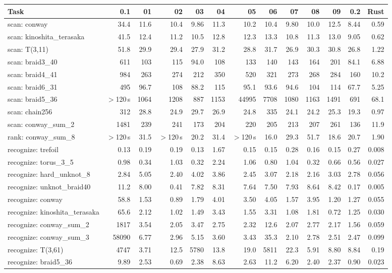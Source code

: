 \begin{tabular}{@{}lrrrrrrrrrrrr@{}}
\toprule
Task & 0.1 & 01 & 02 & 03 & 04 & 05 & 06 & 07 & 08 & 09 & 0.2 & Rust \\
\midrule
scan: conway & 34.4 & 11.6 & 10.4 & 9.86 & 11.3 & 10.2 & 10.4 & 9.80 & 10.0 & 12.5 & 8.44 & 0.59 \\
scan: kinoshita\_terasaka & 41.5 & 12.4 & 11.2 & 10.5 & 12.8 & 12.3 & 13.3 & 10.8 & 11.3 & 13.0 & 9.05 & 0.62 \\
scan: T(3,11) & 51.8 & 29.9 & 29.4 & 27.9 & 31.2 & 28.8 & 31.7 & 26.9 & 30.3 & 30.8 & 26.8 & 1.22 \\
scan: braid3\_40 & 611 & 103 & 115 & 94.0 & 108 & 133 & 140 & 143 & 164 & 201 & 84.1 & 6.88 \\
scan: braid4\_41 & 984 & 263 & 274 & 212 & 350 & 520 & 321 & 273 & 268 & 284 & 160 & 10.2 \\
scan: braid6\_31 & 495 & 96.7 & 108 & 88.2 & 115 & 95.1 & 93.6 & 94.6 & 104 & 114 & 67.7 & 5.25 \\
scan: braid5\_36 & $>$120\,s & 1064 & 1208 & 887 & 1153 & 44995 & 7708 & 1080 & 1163 & 1491 & 691 & 68.1 \\
scan: chain256 & 312 & 28.8 & 24.9 & 29.7 & 26.9 & 24.8 & 335 & 24.1 & 24.2 & 25.3 & 19.3 & 0.97 \\
scan: conway\_sum\_2 & 1481 & 239 & 241 & 173 & 204 & 220 & 205 & 213 & 207 & 261 & 136 & 11.9 \\
\midrule
rank: conway\_sum\_8 & $>$120\,s & 31.5 & $>$120\,s & 20.2 & 31.4 & $>$120\,s & 16.0 & 29.3 & 51.7 & 18.6 & 20.7 & 1.90 \\
\midrule
recognize: trefoil & 0.13 & 0.19 & 0.19 & 0.13 & 1.67 & 0.15 & 0.15 & 0.28 & 0.16 & 0.15 & 0.27 & 0.008 \\
recognize: torus\_3\_5 & 0.98 & 0.34 & 1.03 & 0.32 & 2.24 & 1.06 & 0.80 & 1.04 & 0.32 & 0.66 & 0.56 & 0.027 \\
recognize: hard\_unknot\_8 & 2.84 & 5.05 & 2.40 & 4.02 & 3.86 & 2.45 & 3.07 & 2.18 & 2.16 & 3.03 & 2.78 & 0.056 \\
recognize: unknot\_braid40 & 11.2 & 8.00 & 0.41 & 7.82 & 8.31 & 7.64 & 7.50 & 7.93 & 8.64 & 8.42 & 0.17 & 0.005 \\
recognize: conway & 58.8 & 1.53 & 0.89 & 1.79 & 4.01 & 3.50 & 4.05 & 1.57 & 3.95 & 1.20 & 1.27 & 0.055 \\
recognize: kinoshita\_terasaka & 65.6 & 2.12 & 1.02 & 1.49 & 3.43 & 1.55 & 3.31 & 1.08 & 1.81 & 0.72 & 1.25 & 0.030 \\
recognize: conway\_sum\_2 & 1817 & 3.54 & 2.05 & 3.47 & 2.75 & 2.32 & 12.6 & 2.07 & 2.77 & 2.17 & 1.56 & 0.059 \\
recognize: conway\_sum\_3 & 58090 & 6.77 & 2.96 & 5.15 & 3.60 & 3.43 & 35.3 & 2.10 & 2.78 & 2.51 & 2.47 & 0.099 \\
recognize: T(3,61) & 4747 & 3.71 & 12.5 & 5780 & 13.8 & 19.0 & 5811 & 22.3 & 5.91 & 8.80 & 8.84 & 0.19 \\
recognize: braid5\_36 & 9.89 & 2.53 & 0.69 & 2.38 & 8.63 & 2.63 & 11.2 & 6.20 & 2.40 & 2.37 & 0.90 & 0.023 \\
\bottomrule
\end{tabular}
